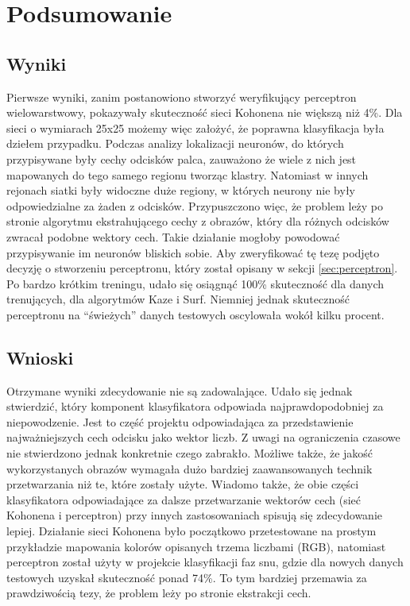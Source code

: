 \documentclass[12pt, notitlepage]{article}
\begin{document}
\newpage
\section{Podsumowanie}

\subsection{Wyniki}

Pierwsze wyniki, zanim postanowiono stworzyć weryfikujący perceptron wielowarstwowy, pokazywały skuteczność sieci Kohonena nie większą niż 4\%. Dla sieci o wymiarach 25x25 możemy więc założyć, że poprawna klasyfikacja była dziełem przypadku. Podczas analizy lokalizacji neuronów, do których przypisywane były cechy odcisków palca, zauważono że wiele z nich jest mapowanych do tego samego regionu tworząc klastry. Natomiast w innych rejonach siatki były widoczne duże regiony, w których neurony nie były odpowiedzialne za żaden z odcisków. Przypuszczono więc, że problem leży po stronie algorytmu ekstrahującego  cechy z obrazów, który dla różnych odcisków zwracał podobne wektory cech. Takie działanie mogłoby powodować przypisywanie im neuronów bliskich sobie. Aby zweryfikować tę tezę podjęto decyzję o stworzeniu perceptronu, który został opisany w sekcji \ref{sec:perceptron}. Po bardzo krótkim treningu, udało się osiągnąć 100\% skuteczność dla danych trenujących, dla algorytmów Kaze i Surf. Niemniej jednak skuteczność perceptronu na ``świeżych'' danych testowych oscylowała wokół kilku procent.  

\subsection{Wnioski}

Otrzymane wyniki zdecydowanie nie są zadowalające. Udało się jednak stwierdzić, który komponent klasyfikatora odpowiada najprawdopodobniej za niepowodzenie. Jest to część projektu odpowiadająca za przedstawienie najważniejszych cech odcisku jako wektor liczb. Z uwagi na ograniczenia czasowe nie stwierdzono jednak konkretnie czego zabrakło. Możliwe także, że jakość wykorzystanych obrazów wymagała dużo bardziej zaawansowanych technik przetwarzania niż te, które zostały użyte. Wiadomo także, że obie części klasyfikatora odpowiadające za dalsze przetwarzanie wektorów cech (sieć Kohonena i perceptron) przy innych zastosowaniach spisują się zdecydowanie lepiej. Działanie sieci Kohonena było początkowo przetestowane na prostym przykładzie mapowania kolorów opisanych trzema liczbami (RGB), natomiast perceptron został użyty w projekcie klasyfikacji faz snu, gdzie dla nowych danych testowych uzyskał skuteczność ponad 74\%. To tym bardziej przemawia za prawdziwością tezy, że problem leży po stronie ekstrakcji cech.
\end{document}
